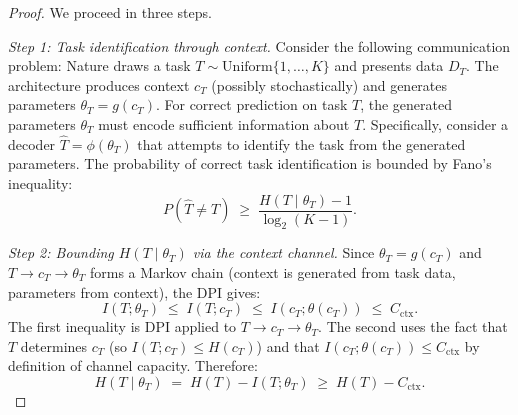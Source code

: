 \documentclass{article}
\begin{document}
\begin{proof}
We proceed in three steps.

\emph{Step 1: Task identification through context.} Consider the following communication problem: Nature draws a task $T \sim \mathrm{Uniform}\{1, \ldots, K\}$ and presents data $D_T$. The architecture produces context $c_T$ (possibly stochastically) and generates parameters $\theta_T = g(c_T)$. For correct prediction on task $T$, the generated parameters $\theta_T$ must encode sufficient information about $T$. Specifically, consider a decoder $\hat{T} = \phi(\theta_T)$ that attempts to identify the task from the generated parameters. The probability of correct task identification is bounded by Fano's inequality:
\begin{equation}
\label{eq:fano}
    P(\hat{T} \neq T) \;\geq\; \frac{H(T \mid \theta_T) - 1}{\log_2(K - 1)}.
\end{equation}

\emph{Step 2: Bounding $H(T \mid \theta_T)$ via the context channel.} Since $\theta_T = g(c_T)$ and $T \to c_T \to \theta_T$ forms a Markov chain (context is generated from task data, parameters from context), the DPI gives:
\begin{equation}
    I(T; \theta_T) \;\leq\; I(T; c_T) \;\leq\; I(c_T; \theta(c_T)) \;\leq\; C_\mathrm{ctx}.
\end{equation}
The first inequality is DPI applied to $T \to c_T \to \theta_T$. The second uses the fact that $T$ determines $c_T$ (so $I(T; c_T) \leq H(c_T)$) and that $I(c_T; \theta(c_T)) \leq C_\mathrm{ctx}$ by definition of channel capacity. Therefore:
\begin{equation}
    H(T \mid \theta_T) \;=\; H(T) - I(T; \theta_T) \;\geq\; H(T) - C_\mathrm{ctx}.
\end{equation}


\end{proof}
\end{document}
